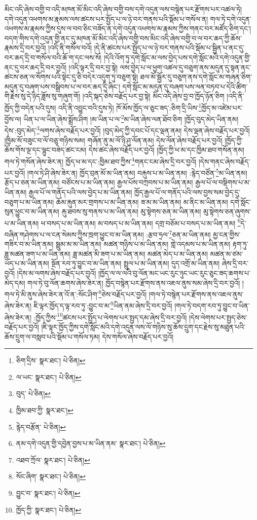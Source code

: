མིང་འདི་ཞེས་བགྱི་བ་འདི་མཁན་མོ་མིང་འདི་ཞེས་བགྱི་བས་དགེ་འདུན་ལས་བསྙེན་པར་རྫོགས་པར་འཚལ་ཏེ། དགེ་འདུན་འཕགས་མ་རྣམས་ལས་ཚངས་པར་སྤྱོད་པ་ལ་ཉེ་བར་གནས་པའི་སྡོམ་པ་གསོལ་ན། གལ་ཏེ་དགེ་འདུན་འཕགས་མ་རྣམས་ཀྱིས་དུས་ལ་བབ་ཅིང་བཟོད་ན་དགེ་འདུན་འཕགས་མ་རྣམས་ཀྱིས་གནང་བར་མཛོད་ཅིག་དང་། བདག་གིས་དགེ་འདུན་གྱི་ནང་དུ་མཁན་མོ་མིང་འདི་ཞེས་བགྱི་བས་མིང་འདི་ཞེས་བགྱི་བ་ལ་བར་ཆད་ཀྱི་ཆོས་རྣམས་དྲི་བར་བྱའོ། །འདི་ནི་གསོལ་བའོ། །དེ་ནི་ཚངས་པར་སྤྱོད་པ་ལ་ཉེ་བར་གནས་པའི་སྡོམ་པ་སྦྱིན་པ་ནང་དུ་བར་ཆད་དྲི་བ་གསོལ་བའི་ཆོ་ག་དང་ལས་སོ། །དེའི་འོག་ཏུ་དགེ་སློང་མ་ལས་བྱེད་པས་དགེ་སློང་མའི་དགེ་འདུན་གྱི་ནང་དུ་བར་ཆད་དྲི་བར་བྱའོ། །འདི་ལྟར་དྲི་བར་བྱ་སྟེ། ལས་བྱེད་པ་ལ་ཕྱག་འཚལ་དུ་བཅུག་ནས་མདུན་དུ་སྟན་ནང་ཚངས་ཅན་ལ་སོགས་པའི་སྟེང་དུ་ཅི་བདེར་འདུག་ཏུ་བཅུག་སྟེ། ཐལ་མོ་སྦྱོར་དུ་བཅུག་ནས་དགེ་སློང་མ་གཞན་ཅིག་མདུན་དུ་བཞག་པས་བསྒྲིབས་པ་ལ་བར་ཆད་དྲི་ཞིང་། དགེ་སློང་མ་མདུན་དུ་བཞག་པས་ལན་བཏབ་པ་དེའི་ཚིག་གི་རྗེས་སུ་དེ་ཉིད་ཟློས་སུ་གཞུག་གོ། །འདི་སྐད་ཅེས་བརྗོད་པར་བྱ་སྟེ། མིང་འདི་ཞེས་བྱ་བ་ཁྱོད་ཉོན་ཅིག །འདི་ནི་ཁྱོད་ཀྱི་བདེན་པའི་དུས། འདི་ནི་འབྱུང་བའི་དུས་ཏེ། ཁོ་མོས་ཁྱོད་ལ་ཅུང་ཟད་:ཅིག་དྲི་ཡིས་\footnote{ཅིག་དྲིས་  སྣར་ཐང་།  པེ་ཅིན། }ཁྱོད་མ་འཛེམ་པར་བྱོས་ལ། ཡིན་པ་ལ་ཡིན་ཞེས་སྨྲོས་ཤིག །མ་ཡིན་པ་ལ་\footnote{ལ་ཡང་  སྣར་ཐང་།  པེ་ཅིན། }མ་ཡིན་ཞེས་ལན་ཐོབ་ཅིག །ཁྱོད་བུད་མེད་ཡིན་ནམ། དེས་:བུད་མེད་\footnote{བུད་  པེ་ཅིན། }ལགས་ཞེས་བརྗོད་པར་བྱའོ། །བུད་མེད་ཀྱི་དབང་པོ་དང་ལྡན་ནམ། དེས་ལྡན་ཞེས་བརྗོད་པར་བྱའོ། །ཁྱིམ་སོ་བཟུང་བ་ལོ་བཅུ་གཉིས་སམ། གཞོན་ནུ་མ་ལོ་ཉི་ཤུ་ལོན་ནམ། དེས་ལོན་ཞེས་བརྗོད་པར་བྱའོ། །ཁྱོད་ཀྱི་ཆོས་གོས་ལྔ་དང་ལྷུང་བཟེད་ཚང་ངམ། དེས་ཚང་ཞེས་བརྗོད་པར་བྱའོ། །ཁྱོད་ཀྱི་ཕ་མ་དང་ཁྱིམ་ཐབ་གསོན་ནམ། གལ་ཏེ་གསོན་ཞེས་ཟེར་ན། ཁྱོད་ཕ་མ་དང་:ཁྱིམ་ཐབ་ཀྱིས་\footnote{ཁྱིམ་ཐབ་ཀྱི་  སྣར་ཐང་། }གནང་ངམ་ཞེས་དྲི་བར་བྱའོ། །དེས་གནང་ཞེས་བརྗོད་པར་བྱའོ། །གལ་ཏེ་ཤི་ཞེས་ཟེར་ན། ཁྱོད་བྲན་མོ་མ་ཡིན་ནམ། བརྐུས་པ་མ་ཡིན་ནམ། :རྙེད་བཙོན་\footnote{རྙེད་བརྩོན་  པེ་ཅིན། }མ་ཡིན་ནམ། རྩོད་པ་ཅན་མ་ཡིན་ནམ། བཙོངས་པ་མ་ཡིན་ནམ། རྒྱལ་པོས་བཀྲབས་པ་མ་ཡིན་ནམ། རྒྱལ་པོ་ལ་བསྡིགས་པ་མ་ཡིན་ནམ། རྒྱལ་པོ་ལ་གནོད་པའི་ལས་བྱེད་པ་མ་ཡིན་ནམ། ཁྱོད་རྒྱལ་པོ་ལ་གནོད་པའི་ལས་བྱས་སམ་བྱེད་དུ་བཅུག་པ་མ་ཡིན་ནམ། ཆོམ་རྐུན་མར་གྲགས་པ་མ་ཡིན་ནམ། ཟ་མ་མ་ཡིན་ནམ། མ་ནིང་མ་ཡིན་ནམ། དགེ་སློང་སུན་ཕྱུང་བ་མ་ཡིན་ནམ། རྐུ་ཐབས་སུ་གནས་པ་མ་ཡིན་ནམ། མུ་སྟེགས་ཅན་མ་ཡིན་ནམ། མུ་སྟེགས་ཅན་ཞུགས་པ་མ་ཡིན་ནམ། ཕ་བསད་པ་མ་ཡིན་ནམ། མ་བསད་པ་མ་ཡིན་ནམ། དགྲ་བཅོམ་པ་བསད་པ་མ་ཡིན་ནམ། \footnote{ནམ་དགེ་འདུན་གྱི་དབྱེན་བྱས་པ་མ་ཡིན་ནམ་  སྣར་ཐང་།  པེ་ཅིན། }དེ་བཞིན་གཤེགས་པ་ལ་ངན་སེམས་ཀྱིས་ཁྲག་ཕྱུང་བ་མ་ཡིན་ནམ། :རྩབ་ཧྲལ་\footnote{འཐབ་ཀྲོལ་  སྣར་ཐང་།  པེ་ཅིན། }ཅན་མ་ཡིན་ནམ། མྱ་ངན་གྱིས་གཟིར་བ་མ་ཡིན་ནམ། སྦྲུམ་མ་མ་ཡིན་ནམ། མཚན་གཉིས་པ་མ་ཡིན་ནམ། གླེ་འདམས་པ་མ་ཡིན་ནམ། རྟག་ཏུ་ཟླ་མཚན་ཟག་པ་མ་ཡིན་ནམ། ཟླ་མཚན་མི་ཟག་པ་མ་ཡིན་ནམ། མཚན་མེད་པ་མ་ཡིན་ནམ། མཚན་མ་ཙམ་ཡོད་པ་མ་ཡིན་ནམ། སྔོན་རབ་ཏུ་བྱུང་བ་མ་ཡིན་ནམ། སྤྲུལ་པ་མ་ཡིན་ནམ། དུད་འགྲོ་མ་ཡིན་ནམ། ཞེས་དྲི་བར་བྱའོ། །དེས་མ་ལགས་ཞེས་བརྗོད་པར་བྱའོ། །ཁྱོད་ལ་ལ་ལའི་བུ་ལོན་མང་ཡང་རུང་ཉུང་ཡང་རུང་ཅུང་ཟད་ཆགས་པ་མེད་དམ། གལ་ཏེ་བུ་ལོན་ཆགས་ཞེས་ཟེར་ན། ཁྱོད་བསྙེན་པར་རྫོགས་ནས་འཇལ་ནུས་སམ་ཞེས་དྲི་བར་བྱའོ། །གལ་ཏེ་མི་ནུས་ཞེས་ཟེར་ན་འོ་ན་:སོང་ཤིག་\footnote{སོང་ཞིག་  སྣར་ཐང་།  པེ་ཅིན། }ཅེས་བརྗོད་པར་བྱའོ། །གལ་ཏེ་བསྙེན་པར་རྫོགས་ནས་འཇལ་ནུས་ཞེས་ཟེར་ན། ཇི་ལྟར་ཁྱོད་ད་ལྟ་རབ་ཏུ་:བྱུང་བ་མ་\footnote{བྱུང་བ་  སྣར་ཐང་།  པེ་ཅིན། }ཡིན་ནམ་ཞེས་དྲི་བར་བྱའོ། །གལ་ཏེ་བདག་རབ་ཏུ་བྱུང་བ་ཡིན་ཞེས་ཟེར་ན། :ཁྱོད་ཀྱིས་\footnote{ཁྱོད་ཀྱི་  སྣར་ཐང་།  པེ་ཅིན། }ཚངས་པར་སྤྱོད་པ་ལེགས་པར་སྤྱད་དམ་ཞེས་དྲི་བར་བྱའོ། །དེས་ལེགས་པར་སྤྱད་ཅེས་བརྗོད་པར་བྱའོ། །ཇི་ལྟར་ཁྱོད་ཀྱིས་དགེ་སློང་མའི་དགེ་འདུན་ལས་ལོ་གཉིས་སུ་ཆོས་དྲུག་དང་རྗེས་སུ་མཐུན་པའི་ཆོས་དྲུག་ལ་བསླབ་པའི་སྡོམ་པ་གསོལ་ཏམ། དེས་གསོལ་ཞེས་བརྗོད་པར་བྱའོ། 